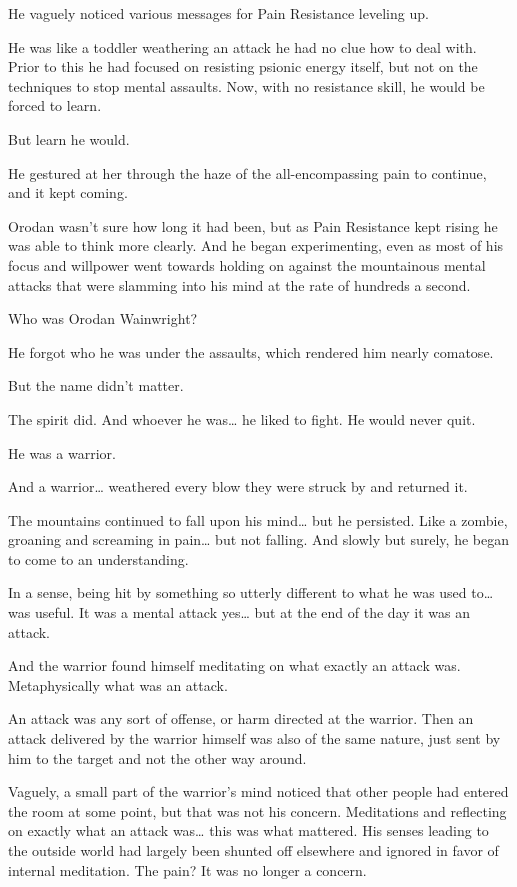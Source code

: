 \documentclass[a4paper,10pt]{book}
\begin{document}
He vaguely noticed various messages for Pain Resistance leveling up.\par
He was like a toddler weathering an attack he had no clue how to deal with. Prior to this he had focused on resisting psionic energy itself, but not on the techniques to stop mental assaults. Now, with no resistance skill, he would be forced to learn.\par
But learn he would.\par
He gestured at her through the haze of the all-encompassing pain to continue, and it kept coming.\par
Orodan wasn’t sure how long it had been, but as Pain Resistance kept rising he was able to think more clearly. And he began experimenting, even as most of his focus and willpower went towards holding on against the mountainous mental attacks that were slamming into his mind at the rate of hundreds a second.\par
Who was Orodan Wainwright?\par
He forgot who he was under the assaults, which rendered him nearly comatose.\par
But the name didn’t matter.\par
The spirit did. And whoever he was… he liked to fight. He would never quit.\par
He was a warrior.\par
And a warrior… weathered every blow they were struck by and returned it.\par
The mountains continued to fall upon his mind… but he persisted. Like a zombie, groaning and screaming in pain… but not falling. And slowly but surely, he began to come to an understanding.\par
In a sense, being hit by something so utterly different to what he was used to… was useful. It was a mental attack yes… but at the end of the day it was an attack.\par
And the warrior found himself meditating on what exactly an attack was. Metaphysically what was an attack.\par
An attack was any sort of offense, or harm directed at the warrior. Then an attack delivered by the warrior himself was also of the same nature, just sent by him to the target and not the other way around.\par
Vaguely, a small part of the warrior’s mind noticed that other people had entered the room at some point, but that was not his concern. Meditations and reflecting on exactly what an attack was… this was what mattered. His senses leading to the outside world had largely been shunted off elsewhere and ignored in favor of internal meditation. The pain? It was no longer a concern.\par
\end{document}
